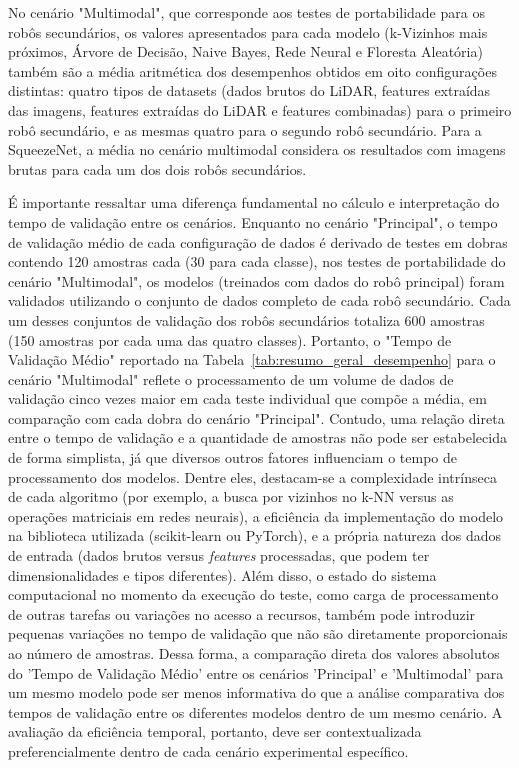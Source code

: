 No cenário "Multimodal", que corresponde aos testes de portabilidade para os robôs secundários, os valores apresentados para cada modelo (k-Vizinhos mais próximos, Árvore de Decisão, Naive Bayes, Rede Neural e Floresta Aleatória) também são a média aritmética dos desempenhos obtidos em oito configurações distintas: quatro tipos de datasets (dados brutos do LiDAR, features extraídas das imagens, features extraídas do LiDAR e features combinadas) para o primeiro robô secundário, e as mesmas quatro para o segundo robô secundário. Para a SqueezeNet, a média no cenário multimodal considera os resultados com imagens brutas para cada um dos dois robôs secundários.

É importante ressaltar uma diferença fundamental no cálculo e interpretação do tempo de validação entre os cenários. Enquanto no cenário "Principal", o tempo de validação médio de cada configuração de dados é derivado de testes em dobras contendo 120 amostras cada (30 para cada classe), nos testes de portabilidade do cenário "Multimodal", os modelos (treinados com dados do robô principal) foram validados utilizando o conjunto de dados completo de cada robô secundário. Cada um desses conjuntos de validação dos robôs secundários totaliza 600 amostras (150 amostras por cada uma das quatro classes). Portanto, o "Tempo de Validação Médio" reportado na Tabela~\ref{tab:resumo_geral_desempenho} para o cenário "Multimodal" reflete o processamento de um volume de dados de validação cinco vezes maior em cada teste individual que compõe a média, em comparação com cada dobra do cenário "Principal". Contudo, uma relação direta entre o tempo de validação e a quantidade de amostras não pode ser estabelecida de forma simplista, já que diversos outros fatores influenciam o tempo de processamento dos modelos. Dentre eles, destacam-se a complexidade intrínseca de cada algoritmo (por exemplo, a busca por vizinhos no k-NN versus as operações matriciais em redes neurais), a eficiência da implementação do modelo na biblioteca utilizada (scikit-learn ou PyTorch), e a própria natureza dos dados de entrada (dados brutos versus \textit{features} processadas, que podem ter dimensionalidades e tipos diferentes). Além disso, o estado do sistema computacional no momento da execução do teste, como carga de processamento de outras tarefas ou variações no acesso a recursos, também pode introduzir pequenas variações no tempo de validação que não são diretamente proporcionais ao número de amostras. Dessa forma, a comparação direta dos valores absolutos do 'Tempo de Validação Médio' entre os cenários 'Principal' e 'Multimodal' para um mesmo modelo pode ser menos informativa do que a análise comparativa dos tempos de validação entre os diferentes modelos dentro de um mesmo cenário. A avaliação da eficiência temporal, portanto, deve ser contextualizada preferencialmente dentro de cada cenário experimental específico.



